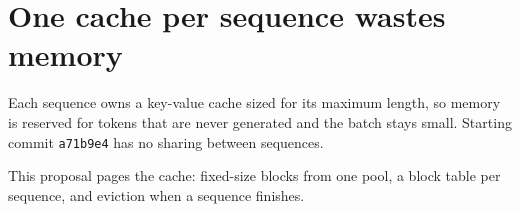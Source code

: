 \section{One cache per sequence wastes memory}
Each sequence owns a key-value cache sized for its maximum length, so memory is reserved for tokens that are never generated and the batch stays small. Starting commit \verb|a71b9e4| has no sharing between sequences.

This proposal pages the cache: fixed-size blocks from one pool, a block table per sequence, and eviction when a sequence finishes.
